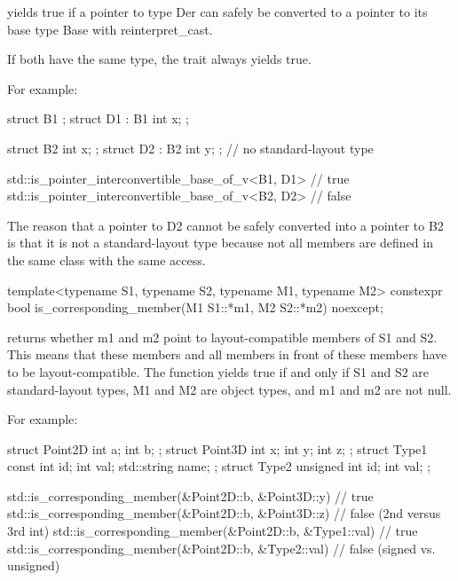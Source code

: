 

yields true if a pointer to type Der can safely be converted to a pointer to its base type Base with reinterpret\_cast.

If both have the same type, the trait always yields true.

For example:

\begin{cpp}
struct B1 { };
struct D1 : B1 { int x; };

struct B2 { int x; };
struct D2 : B2 { int y; }; // no standard-layout type

std::is_pointer_interconvertible_base_of_v<B1, D1> // true
std::is_pointer_interconvertible_base_of_v<B2, D2> // false
\end{cpp}

The reason that a pointer to D2 cannot be safely converted into a pointer to B2 is that it is not a standard-layout type because not all members are defined in the same class with the same access.


\begin{cpp}
template<typename S1, typename S2, typename M1, typename M2>
constexpr bool is_corresponding_member(M1 S1::*m1, M2 S2::*m2) noexcept;
\end{cpp}

returns whether m1 and m2 point to layout-compatible members of S1 and S2. This means that these members and all members in front of these members have to be layout-compatible. The function yields true if and only if S1 and S2 are standard-layout types, M1 and M2 are object types, and m1 and m2 are not null.

For example:

\begin{cpp}
struct Point2D { int a; int b; };
struct Point3D { int x; int y; int z; };
struct Type1 { const int id; int val; std::string name; };
struct Type2 { unsigned int id; int val; };

std::is_corresponding_member(&Point2D::b, &Point3D::y) // true
std::is_corresponding_member(&Point2D::b, &Point3D::z) // false (2nd versus 3rd int)
std::is_corresponding_member(&Point2D::b, &Type1::val) // true
std::is_corresponding_member(&Point2D::b, &Type2::val) // false (signed vs. unsigned)
\end{cpp}

